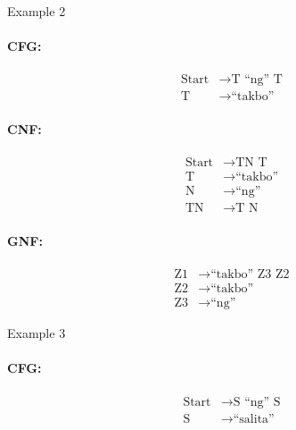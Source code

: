 Example 2
\paragraph{CFG:}
\begin{equation*}
    \begin{aligned}
        \text{Start}   & \rightarrow \text{T “ng” T}   \\
        \text{T} & \rightarrow \text{“takbo”}
    \end{aligned}
\end{equation*}

\paragraph{CNF:}
\begin{equation*}
    \begin{aligned}
        \text{Start}   & \rightarrow \text{TN T}   \\
        \text{T} & \rightarrow \text{“takbo”} \\
        \text{N} & \rightarrow \text{“ng”} \\
        \text{TN} & \rightarrow \text{T N}
    \end{aligned}
\end{equation*}

\paragraph{GNF:}
\begin{equation*}
    \begin{aligned}
        \text{Z1}   & \rightarrow \text{“takbo” Z3 Z2}   \\
        \text{Z2} & \rightarrow \text{“takbo”} \\
        \text{Z3} & \rightarrow \text{“ng”}
    \end{aligned}
\end{equation*}

Example 3
\paragraph{CFG:}
\begin{equation*}
    \begin{aligned}
        \text{Start}   & \rightarrow \text{S “ng” S}   \\
        \text{S} & \rightarrow \text{“salita”}
    \end{aligned}
\end{equation*}

